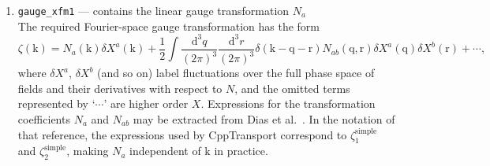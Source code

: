\documentclass[11pt,a4paper]{article}
\renewcommand{\d}{\mathrm{d}}
\newcommand{\vect}[1]{\bm{\mathrm{{#1}}}}
\newcommand{\packagefont}{\sffamily}
\newcommand{\CppTransport}{{\packagefont CppTransport}}
\newenvironment{sqltablelist}{\renewcommand{\arraystretch}{1.3}\small}{}
\begin{document}
\begin{sqltablelist}
\begin{enumerate}
    \item \texttt{gauge_xfm1} --- contains the linear gauge transformation $N_a$ \\
    The required Fourier-space gauge transformation has the form
    \begin{equation}
    	\zeta(\vect{k}) =
    	N_a(\vect{k})
    	\delta X^a(\vect{k})	
    	+
    	\frac{1}{2}
    	\int \frac{\d^3 q}{(2\pi)^3} \frac{\d^3 r}{(2\pi)^3}
    	\delta(\vect{k} - \vect{q} - \vect{r})
    	N_{ab}(\vect{q},\vect{r})
    	\delta X^a(\vect{q})
    	\delta X^b(\vect{r})
    	+ \cdots ,
    	\label{eq:gauge-xfm}
    \end{equation}
	where $\delta X^a$, $\delta X^b$ (and so on) label fluctuations over the full phase space
	of fields and their derivatives with respect to $N$,
	and the omitted terms represented by `$\cdots$' are higher order
	$X$.
	Expressions for the transformation coefficients
	$N_a$ and $N_{ab}$ may be extracted from Dias et al.~\cite{Dias:2014msa}.
	In the notation of that reference,
	the expressions used by {\CppTransport} correspond to
	$\zeta_1^{\text{simple}}$
	and
	$\zeta_2^{\text{simple}}$,
	making $N_a$ independent of $\vect{k}$ in practice.
	

\end{enumerate}
\end{sqltablelist}
\end{document}
